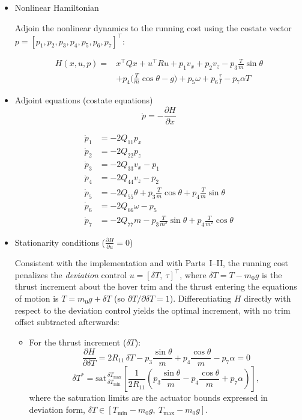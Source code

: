 \documentclass[letterpaper, 10 pt, conference]{ieeeconf}
\begin{document}
\begin{itemize}
    \item Nonlinear Hamiltonian
    
    Adjoin the nonlinear dynamics to the running cost using the costate vector $p = [p_1, p_2, p_3, p_4, p_5, p_6, p_7]^\top$:

    \[
    \begin{aligned}
        H(x, u, p) ={}& x^\top Q x + u^\top R u + p_1 v_x + p_2 v_z - p_3 \tfrac{T}{m}\sin\theta \\
        &+ p_4 \big( \tfrac{T}{m}\cos\theta - g \big) + p_5 \omega + p_6 \tfrac{\tau}{I} - p_7 \alpha T
    \end{aligned}
    \]

    \item Adjoint equations (costate equations)
    \[\dot{p} = -\frac{\partial H}{\partial x}\]
    
    \[
    \begin{aligned}
    \dot{p}_1 &= -2Q_{11} p_x \\
    \dot{p}_2 &= -2Q_{22} p_z \\
    \dot{p}_3 &= -2Q_{33} v_x - p_1 \\
    \dot{p}_4 &= -2Q_{44} v_z - p_2 \\
    \dot{p}_5 &= -2Q_{55} \theta + p_3 \frac{T}{m}\cos\theta + p_4 \frac{T}{m}\sin\theta \\
    \dot{p}_6 &= -2Q_{66} \omega - p_5 \\
    \dot{p}_7 &= -2Q_{77} m - p_3 \frac{T}{m^2}\sin\theta + p_4 \frac{T}{m^2}\cos\theta
    \end{aligned}
    \]
    
    \item Stationarity conditions ($\frac{\partial H}{\partial u} = 0$)

    Consistent with the implementation and with Parts~I--II, the running cost penalizes the \emph{deviation} control $u=[\delta T,\ \tau]^\top$, where $\delta T = T - m_0 g$ is the thrust increment about the hover trim and the thrust entering the equations of motion is $T = m_0 g + \delta T$ (so $\partial T/\partial \delta T = 1$). Differentiating $H$ directly with respect to the deviation control yields the optimal increment, with no trim offset subtracted afterwards:

    \begin{itemize}
        \item For the thrust increment ($\delta T$):
        \[\frac{\partial H}{\partial \delta T} = 2R_{11}\,\delta T - p_3 \frac{\sin\theta}{m} + p_4 \frac{\cos\theta}{m} - p_7 \alpha = 0\]
        \[\delta T^* = \text{sat}_{\,\delta T_{\min}}^{\,\delta T_{\max}} \left[ \frac{1}{2 R_{11}} \left( p_3 \frac{\sin\theta}{m} - p_4 \frac{\cos\theta}{m} + p_7 \alpha \right) \right],\]
        where the saturation limits are the actuator bounds expressed in deviation form, $\delta T \in [T_{\min}-m_0 g,\ T_{\max}-m_0 g]$.


\end{itemize}
\end{itemize}
\end{document}

